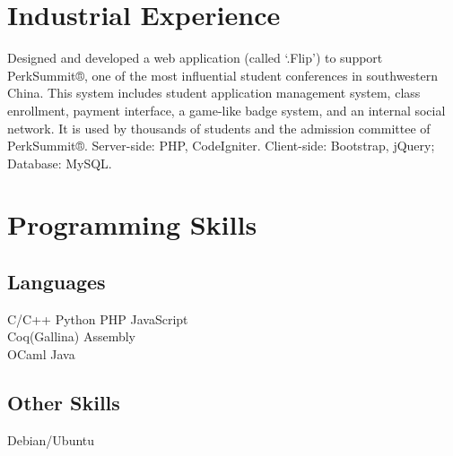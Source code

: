 \documentclass[]{deedy-resume-openfont}
\begin{document}

\section{Industrial Experience}
Designed and developed a web application (called ‘.Flip’) to support PerkSummit®, one of the most influential student conferences in southwestern China.
This system includes student application management system, class enrollment, payment interface, a game-like badge system, and an internal social network.
It is used by thousands of students and the admission committee of PerkSummit®.
Server-side: PHP, CodeIgniter. Client-side: Bootstrap, jQuery; Database: MySQL.
\sectionsep


\section{Programming Skills}
\begin{minipage}[t]{.6\textwidth}
\subsection{Languages}
C/C++ \textbullet{} Python \textbullet{} PHP \textbullet{} JavaScript \\
Coq(Gallina) \textbullet{} Assembly \textbullet{} \\
OCaml \textbullet{} Java

\sectionsep
\end{minipage}
\hfill
\begin{minipage}[t]{.35\textwidth}
\subsection{Other Skills}
 Debian/Ubuntu\\
\end{minipage}

\end{document}

